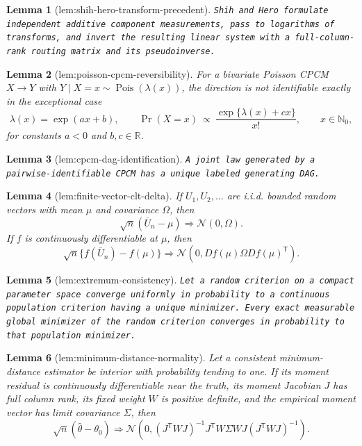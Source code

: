 \documentclass{article}
\newtheorem{lemma}{Lemma}
\begin{document}
\begin{lemma}[lem:shih-hero-transform-precedent]\label{lem:shih-hero-transform-precedent}
\texttt{Shih and Hero formulate independent additive component measurements,\allowbreak{} pass to logarithms of transforms,\allowbreak{} and invert the resulting linear system with a full-\allowbreak{}column-\allowbreak{}rank routing matrix and its pseudoinverse.}
\end{lemma}

\begin{lemma}[lem:poisson-cpcm-reversibility]\label{lem:poisson-cpcm-reversibility}
For a bivariate Poisson CPCM \(X\to Y\) with \(Y\mid X=x\sim\operatorname{Pois}(\lambda(x))\), the direction is not identifiable exactly in the exceptional case
\[
\lambda(x)=\exp(ax+b),\qquad
\Pr(X=x)\ \mathrel{\propto}\ \frac{\exp\{\lambda(x)+cx\}}{x!},
\qquad x\in\mathbb N _0,
\]
for constants \(a<0\) and \(b,c\in\mathbb R\).
\end{lemma}

\begin{lemma}[lem:cpcm-dag-identification]\label{lem:cpcm-dag-identification}
\texttt{A joint law generated by a pairwise-\allowbreak{}identifiable CPCM has a unique labeled generating DAG.}
\end{lemma}

\begin{lemma}[lem:finite-vector-clt-delta]\label{lem:finite-vector-clt-delta}
If \(U_1,U_2,\ldots\) are i.i.d. bounded random vectors with mean \(\mu\) and covariance \(\Omega\), then
\[
\sqrt n(\overline U_n-\mu)\Rightarrow\mathcal N(0,\Omega).
\]
If \(f\) is continuously differentiable at \(\mu\), then
\[
\sqrt n\{f(\overline U_n)-f(\mu)\}\Rightarrow
\mathcal N\!\left(0,Df(\mu)\Omega Df(\mu)^{\mathsf T}\right).
\]
\end{lemma}

\begin{lemma}[lem:extremum-consistency]\label{lem:extremum-consistency}
\texttt{Let a random criterion on a compact parameter space converge uniformly in probability to a continuous population criterion having a unique minimizer.  Every exact measurable global minimizer of the random criterion converges in probability to that population minimizer.}
\end{lemma}

\begin{lemma}[lem:minimum-distance-normality]\label{lem:minimum-distance-normality}
Let a consistent minimum-distance estimator be interior with probability tending to one.  If its moment residual is continuously differentiable near the truth, its moment Jacobian \(J\) has full column rank, its fixed weight \(W\) is positive definite, and the empirical moment vector has limit covariance \(\Sigma\), then
\[
\sqrt n(\widehat\theta-\theta_0)\Rightarrow
\mathcal N\!\left(0,
(J^{\mathsf T}WJ)^{-1}J^{\mathsf T}W\Sigma WJ
(J^{\mathsf T}WJ)^{-1}\right).
\]
\end{lemma}
\end{document}
